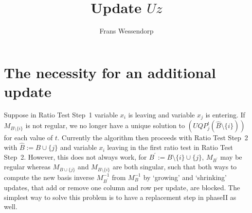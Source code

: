 \documentclass[a4paper]{article}
\title{Update $Uz$}
\author{Frans Wessendorp}
\begin{document}
\maketitle
\section{The necessity for an additional update}
Suppose in Ratio Test Step~1 variable $x_{i}$ is leaving and variable $x_{j}$ is
entering. If $M_{B \setminus \{i\}}$ is not regular, we no longer have a unique
solution to $(UQP_{j}^{t}(\hat{B} \setminus \{i\}))$ for each value of $t$.
Currently the algorithm then proceeds with Ratio Test Step~2 with
$\hat{B}:=B \cup \{j\}$ and variable $x_{i}$ leaving in the first ratio test in
Ratio Test Step~2. However, this does not always work, for
$B^{\prime}:=B \setminus \{i\} \cup \{j\}$, $M_{B^{\prime}}$ may be regular
whereas $M_{B \cup \{j\}}$ and $M_{B \setminus \{i\}}$ are both singular, such
that both ways to compute the new basis inverse $M_{B^{\prime}}^{-1}$ from
$M_{B}^{-1}$ by `growing' and `shrinking' updates,
that add or remove one column and row per update,
are blocked. The simplest way
to solve this problem is to have a replacement step in phaseII as well. 
\end{document}
